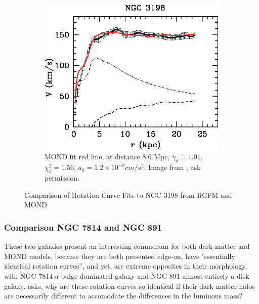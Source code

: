\documentclass[reprint,%
 amsmath,amssymb,
 aps,
]{revtex4-1}
\begin{document}
\begin{figure}[h!]
\begin{subfigure}[c]{0.5\linewidth}
    \centering
    \includegraphics[width=0.95\linewidth]{figures/NGC3198_TAM_aa15283-10-fig7.eps} 
    \caption{ 
    MOND fit red line, at distance $8.6$ Mpc,    $\gamma_d =  1.01$, $\chi_\nu^2=1.56$, $a_0 = 1.2 \times 10^{-8} cm/ s^2$. Image from \citet{Blok1}, ask permission.  } 
    \label{fig:NGC3198MOND} 
  \end{subfigure}%
  \caption{ Comparison of Rotation Curve Fits  to NGC 3198 from RCFM and MOND }
  \label{fig1super} 
\end{figure}


    \subsubsection{Comparison NGC 7814 and NGC 891}
  
 These two galaxies present an interesting conundrum for both dark matter and MOND models, because they are both presented edge-on, have 'essentially identical rotation curves'', and yet,  are extreme opposites in their morphology,  with NGC 7814 a bulge dominated galaxy and NGC 891 almost entirely a disk galaxy. 
 \citet{Frat1} asks, why are these rotation curves so identical if their dark matter halos are necessarily different to accomodate the differences in the luminous mass?
 
 
\end{document}
